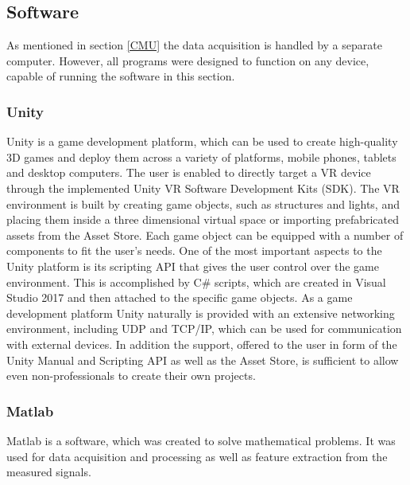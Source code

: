 \subsection{Software}
As mentioned in section \ref{CMU} the data acquisition is handled by a separate computer. However, all programs were designed to function on any device, capable of running the software in this section. 

\subsubsection{Unity}
Unity is a game development platform, which can be used to create high-quality 3D games and deploy them across a variety of platforms, mobile phones, tablets and desktop computers. The user is enabled to directly target a VR device through the implemented Unity VR Software Development Kits (SDK). The VR environment is built by creating game objects, such as structures and lights, and placing them inside a three dimensional virtual space or importing prefabricated assets from the Asset Store. Each game object can be equipped with a number of components to fit the user's needs. One of the most important aspects to the Unity platform is its scripting API that gives the user control over the game environment. This is accomplished by C\# scripts, which are created in Visual Studio 2017 and then attached to the specific game objects. As a game development platform Unity naturally is provided with an extensive networking environment, including UDP and TCP/IP, which can be used for communication with external devices. In addition the support, offered to the user in form of the Unity Manual and Scripting API as well as the Asset Store, is sufficient to allow even non-professionals to create their own projects.

\subsubsection{Matlab}
Matlab is a software, which was created to solve mathematical problems. It was used for data acquisition and processing as well as feature extraction from the measured signals.


